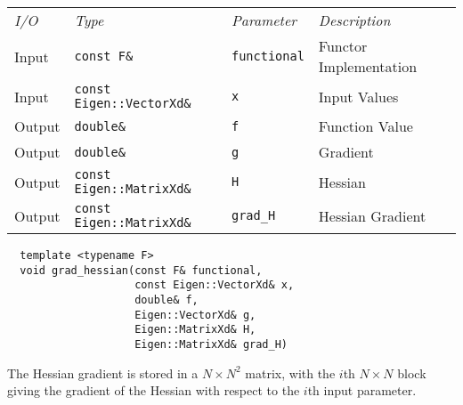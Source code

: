 \begin{tcolorbox}[colback=white,colframe=gray90, coltitle=black,boxrule=3pt,
fonttitle=\bfseries,title=Hessian Gradient]

\begin{tabular}{llll}
\textit{I/O} & \textit{Type} & \textit{Parameter} & \textit{Description} \\
Input & \texttt{const F\&} & \texttt{functional} & Functor Implementation \\
Input & \texttt{const Eigen::VectorXd\&} & \texttt{x} & Input Values \\
Output & \texttt{double\&} & \texttt{f} & Function Value \\
Output & \texttt{double\&} & \texttt{g} & Gradient \\
Output & \texttt{const Eigen::MatrixXd\&} & \texttt{H} & Hessian \\
Output & \texttt{const Eigen::MatrixXd\&} & \texttt{grad\_H} & Hessian Gradient \\
\end{tabular}

\vspace{5mm}

\begin{verbatim}
  template <typename F>
  void grad_hessian(const F& functional,
                    const Eigen::VectorXd& x,
                    double& f,
                    Eigen::VectorXd& g,
                    Eigen::MatrixXd& H,
                    Eigen::MatrixXd& grad_H)
\end{verbatim}

\vspace{5mm}

The Hessian gradient is stored in a $N \times N^{2}$ matrix, with the $i$th
$N \times N$ block giving the gradient of the Hessian with respect to the
$i$th input parameter.

\end{tcolorbox}

